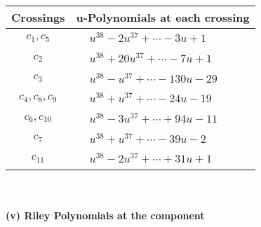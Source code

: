 \documentclass[1p]{elsarticle_modified}
\theoremstyle{definition}
\begin{document}
\begin{tabular}{m{50pt}|m{274pt}}
Crossings & \hspace{64pt}u-Polynomials at each crossing \\
\hline $$\begin{aligned}c_{1},c_{5}\end{aligned}$$&$\begin{aligned}
&u^{38}-2 u^{37}+\cdots-3 u+1
\end{aligned}$\\
\hline $$\begin{aligned}c_{2}\end{aligned}$$&$\begin{aligned}
&u^{38}+20 u^{37}+\cdots-7 u+1
\end{aligned}$\\
\hline $$\begin{aligned}c_{3}\end{aligned}$$&$\begin{aligned}
&u^{38}- u^{37}+\cdots-130 u-29
\end{aligned}$\\
\hline $$\begin{aligned}c_{4},c_{8},c_{9}\end{aligned}$$&$\begin{aligned}
&u^{38}+u^{37}+\cdots-24 u-19
\end{aligned}$\\
\hline $$\begin{aligned}c_{6},c_{10}\end{aligned}$$&$\begin{aligned}
&u^{38}-3 u^{37}+\cdots+94 u-11
\end{aligned}$\\
\hline $$\begin{aligned}c_{7}\end{aligned}$$&$\begin{aligned}
&u^{38}+u^{37}+\cdots-39 u-2
\end{aligned}$\\
\hline $$\begin{aligned}c_{11}\end{aligned}$$&$\begin{aligned}
&u^{38}-2 u^{37}+\cdots+31 u+1
\end{aligned}$\\
\hline
\end{tabular}\\~\\
\newpage\renewcommand{\arraystretch}{1}
\flushleft \textbf{(v) Riley Polynomials at the component}\newline \\
\end{document}
